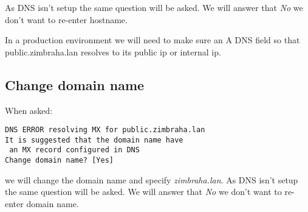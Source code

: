 As DNS isn't setup the same question will be asked. We will answer that \textit{No} we don't want to re-enter hostname.

In a production environment we will need to make sure an A DNS field so that public.zimbraha.lan resolves to its public ip or internal ip.

\subsection {Change domain name}
When asked:
\begin{verbatim}
DNS ERROR resolving MX for public.zimbraha.lan
It is suggested that the domain name have
 an MX record configured in DNS
Change domain name? [Yes] 
\end{verbatim}
we will change the domain name and specify \textit{zimbraha.lan}. As DNS isn't setup the same question will be asked. We will answer that \textit{No} we don't want to re-enter domain name.

